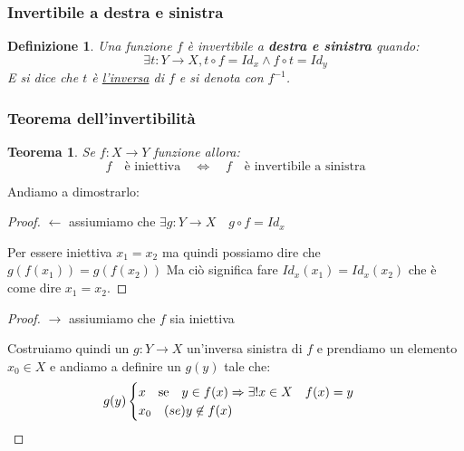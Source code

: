 \documentclass{article}
\newtheorem{theorem}{Teorema}[section]
\newtheorem{definition}{Definizione}[section]
\begin{document}
\subsubsection{Invertibile a destra e sinistra}\label{sec:invertibile_a_destra_e_sinistra}
\begin{definition}     
        Una funzione $ f $ è invertibile a \textbf{destra e sinistra} quando:
        \begin{equation*}
                \exists t : Y \to X, t \circ f = Id_x \wedge f \circ t = Id_y 
        \end{equation*}
        E si dice che $ t  $ è \underline{l'inversa} di $ f $ e si denota con $ f^{-1} $.           
\end{definition}


\subsubsection{Teorema dell'invertibilità}
\begin{theorem}
       Se $ f: X \to Y $ funzione allora:
       \begin{equation*}
               f \quad \mbox{è iniettiva} \quad \Leftrightarrow \quad f \quad \mbox{è invertibile a sinistra}
       \end{equation*}
\end{theorem}
Andiamo a dimostrarlo:
\begin{proof}
        $ \leftarrow $ assiumiamo che $ \exists g : Y \to X \quad g \circ f = Id_x  $ \par
        Per essere iniettiva $ x_1 = x_2$ ma quindi possiamo dire che $ g(f(x_1)) = g(f(x_2)) $ \newline
        Ma ciò significa fare $ Id_x(x_1) = Id_x(x_2) $ che è come dire $ x_1 = x_2 $.  
\end{proof}

\begin{proof}
        $ \rightarrow $ assiumiamo che $ f$ sia iniettiva \par
        Costruiamo quindi un $ g : Y \to X $ un'inversa sinistra di $ f $ e prendiamo un elemento $x_0 \in X$ e andiamo a definire un $ g(y) $ tale che:
        \[ g(y)
        \begin{cases}
                x \quad \mbox{se} \quad y \in f(x) \Rightarrow \exists! x \in X \quad f(x) = y     \\
                x_0 \quad \mbox(se) y \not \in f(x)
        \end{cases}
        \]
\end{proof}
\end{document}
